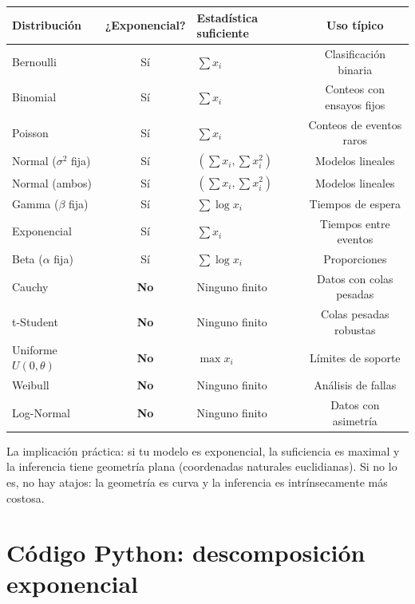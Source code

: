 \begin{center}
	\renewcommand{\arraystretch}{1.2}
	\begin{tabular}{|l|c|l|c|}
		\hline
		\textbf{Distribución} & \textbf{¿Exponencial?} & \textbf{Estadística suficiente} & \textbf{Uso típico} \\
		\hline
		Bernoulli & Sí & $\sum x_i$ & Clasificación binaria \\
		Binomial & Sí & $\sum x_i$ & Conteos con ensayos fijos \\
		Poisson & Sí & $\sum x_i$ & Conteos de eventos raros \\
		Normal ($\sigma^2$ fija) & Sí & $(\sum x_i, \sum x_i^2)$ & Modelos lineales \\
		Normal (ambos) & Sí & $(\sum x_i, \sum x_i^2)$ & Modelos lineales \\
		Gamma ($\beta$ fija) & Sí & $\sum \log x_i$ & Tiempos de espera \\
		Exponencial & Sí & $\sum x_i$ & Tiempos entre eventos \\
		Beta ($\alpha$ fija) & Sí & $\sum \log x_i$ & Proporciones \\
		Cauchy & \textbf{No} & Ninguno finito & Datos con colas pesadas \\
		t-Student & \textbf{No} & Ninguno finito & Colas pesadas robustas \\
		Uniforme $U(0,\theta)$ & \textbf{No} & $\max x_i$ & Límites de soporte \\
		Weibull & \textbf{No} & Ninguno finito & Análisis de fallas \\
		Log-Normal & \textbf{No} & Ninguno finito & Datos con asimetría \\
		\hline
	\end{tabular}
\end{center}

\noindent La implicación práctica: si tu modelo es exponencial, la suficiencia es maximal y la inferencia tiene geometría plana (coordenadas naturales euclidianas).  Si no lo es, no hay atajos: la geometría es curva y la inferencia es intrínsecamente más costosa.

\section{Código Python: descomposición exponencial}

